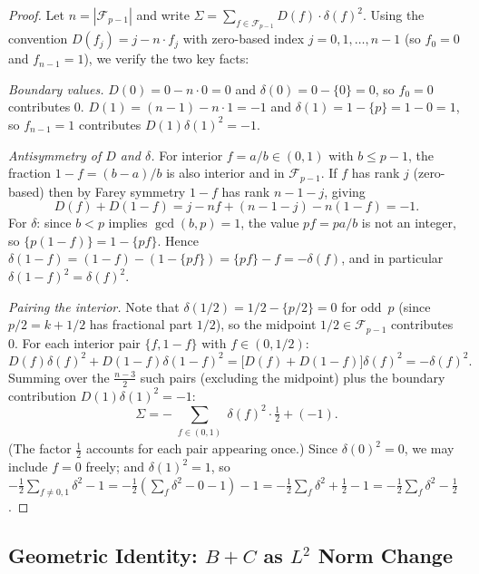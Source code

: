 \documentclass[11pt]{article}
\theoremstyle{definition}
\newcommand{\F}{\mathcal{F}}
\begin{document}
\begin{proof}
Let $n = |\F_{p-1}|$ and write $\Sigma = \sum_{f \in \F_{p-1}} D(f)\cdot\delta(f)^2$.
Using the convention $D(f_j) = j - n \cdot f_j$ with
zero-based index $j = 0, 1, \ldots, n-1$ (so $f_0 = 0$ and
$f_{n-1} = 1$), we verify the two key facts:

\medskip
\noindent\textit{Boundary values.}
$D(0) = 0 - n\cdot 0 = 0$ and $\delta(0) = 0 - \{0\} = 0$, so $f_0=0$
contributes $0$.
$D(1) = (n-1) - n\cdot 1 = -1$ and $\delta(1) = 1 - \{p\} = 1 - 0 = 1$,
so $f_{n-1}=1$ contributes $D(1)\delta(1)^2 = -1$.

\medskip
\noindent\textit{Antisymmetry of $D$ and $\delta$.}
For interior $f = a/b \in (0,1)$ with $b \le p-1$, the fraction
$1-f = (b-a)/b$ is also interior and in $\F_{p-1}$.
If $f$ has rank $j$ (zero-based) then by Farey symmetry
$1-f$ has rank $n-1-j$, giving
\begin{equation*}
D(f) + D(1-f) = j - nf + (n-1-j) - n(1-f) = -1.
\end{equation*}
For $\delta$: since $b < p$ implies $\gcd(b,p)=1$, the value
$pf = pa/b$ is not an integer, so $\{p(1-f)\} = 1 - \{pf\}$.
Hence $\delta(1-f) = (1-f) - (1-\{pf\}) = \{pf\} - f = -\delta(f)$,
and in particular $\delta(1-f)^2 = \delta(f)^2$.

\medskip
\noindent\textit{Pairing the interior.}
Note that $\delta(1/2) = 1/2 - \{p/2\} = 0$ for odd~$p$
(since $p/2 = k + 1/2$ has fractional part $1/2$),
so the midpoint $1/2 \in \F_{p-1}$ contributes~$0$.
For each interior pair $\{f, 1-f\}$ with $f \in (0, 1/2)$:
\begin{equation*}
D(f)\delta(f)^2 + D(1-f)\delta(1-f)^2
= \bigl[D(f) + D(1-f)\bigr]\delta(f)^2 = -\delta(f)^2.
\end{equation*}
Summing over the $\frac{n-3}{2}$ such pairs (excluding the midpoint)
plus the boundary contribution $D(1)\delta(1)^2 = -1$:
\begin{equation*}
\Sigma = -\sum_{\substack{f \in (0,1)}} \delta(f)^2\cdot\tfrac{1}{2} + (-1).
\end{equation*}
(The factor $\frac{1}{2}$ accounts for each pair appearing once.)
Since $\delta(0)^2 = 0$, we may include $f=0$ freely; and
$\delta(1)^2 = 1$, so
$-\tfrac{1}{2}\sum_{f\ne 0,1}\delta^2 - 1
= -\tfrac{1}{2}\!\left(\sum_f \delta^2 - 0 - 1\right) - 1
= -\tfrac{1}{2}\sum_f \delta^2 + \tfrac{1}{2} - 1
= -\tfrac{1}{2}\sum_f \delta^2 - \tfrac{1}{2}$.
\end{proof}


\subsection{Geometric Identity: $B+C$ as $L^2$ Norm Change}
\end{document}
